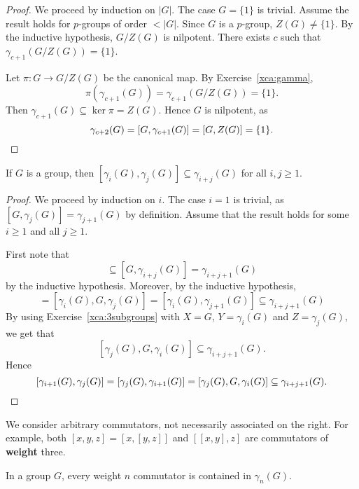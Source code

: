 \begin{proof}
We proceed by induction on $|G|$. The case $G=\{1\}$ is trivial. 
Assume the result holds for $p$-groups of order $<|G|$. Since 
$G$ is a $p$-group, $Z(G)\ne\{1\}$. By the inductive hypothesis, 
$G/Z(G)$ is nilpotent. There exists $c$ such that 
$\gamma_{c+1}(G/Z(G))=\{1\}$. 
	
Let $\pi\colon G\to G/Z(G)$ be the canonical map.  
By Exercise~\ref{xca:gamma},
\[
\pi(\gamma_{c+1}(G))=\gamma_{c+1}(G/Z(G))=\{1\}. 
\]
Then $\gamma_{c+1}(G)\subseteq \ker\pi=Z(G)$. Hence
$G$ is nilpotent, as 
\[	
\gamma_{c+2}(G)=[G,\gamma_{c+1}(G)]=[G,Z(G)]=\{1\}.\qedhere
\]
\end{proof}

\begin{theorem}
\label{thm:gamma}
If $G$ is a group, then $[\gamma_i(G),\gamma_j(G)]\subseteq
\gamma_{i+j}(G)$ for all $i,j\geq1$.	
\end{theorem}

\begin{proof}
We proceed by induction on $i$. The case $i=1$ is trivial, as
$[G,\gamma_j(G)]=\gamma_{j+1}(G)$ by definition. Assume that
the result holds for some $i\geq1$ and all $j\geq 1$. 
	
First note that 
\begin{equation*}
[G,\gamma_i(G),\gamma_j(G)]\subseteq [G,\gamma_{i+j}(G)]=\gamma_{i+j+1}(G)
\end{equation*}
by the inductive hypothesis. Moreover, by the inductive hypothesis, 
\begin{equation*}
[\gamma_i(G),\gamma_j(G),G]=[\gamma_i(G),G,\gamma_j(G)]=[\gamma_{i}(G),\gamma_{j+1}(G)]\subseteq \gamma_{i+j+1}(G)
\end{equation*}
By using Exercise~\ref{xca:3subgroups} with $X=G$, $Y=\gamma_i(G)$ and $Z=\gamma_j(G)$,
we get that 
\[
[\gamma_j(G),G,\gamma_i(G)]\subseteq \gamma_{i+j+1}(G).
\]
Hence  
\[
[\gamma_{i+1}(G),\gamma_{j}(G)]=[\gamma_{j}(G),\gamma_{i+1}(G)]=[\gamma_j(G),G,\gamma_i(G)]\subseteq \gamma_{i+j+1}(G).\qedhere
\]
\end{proof}

We consider arbitrary commutators, not necessarily associated on the right.   
For example, both $[x,y,z]=[x,[y,z]]$ and $[[x,y],z]$ are commutators of \textbf{weight} three. 

\begin{corollary}
In a group $G$, every weight $n$ commutator is contained in 
$\gamma_n(G)$.
\end{corollary}

